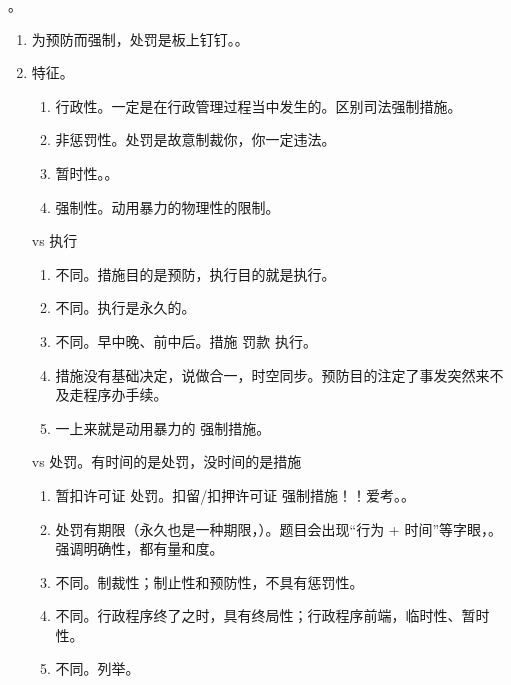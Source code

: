 \begin{enumerate}
        。
        \begin{enumerate}
          \item 为预防而强制，处罚是板上钉钉。。
          \item 特征。
                \begin{enumerate}
                  \item 行政性。一定是在行政管理过程当中发生的。区别司法强制措施。
                  \item 非惩罚性。处罚是故意制裁你，你一定违法。
                  \item 暂时性。。
                  \item 强制性。动用暴力的物理性的限制。
                \end{enumerate}

                \begin{kk}{vs 执行}
                  \begin{enumerate}
                    \item {}不同。措施目的是预防，执行目的就是执行。
                    \item {}不同。执行是永久的。
                    \item {}不同。早中晚、前中后。措施 \yjt 罚款 \yjt 执行。
                    \item 措施没有基础决定，说做合一，时空同步。预防目的注定了事发突然来不及走程序办手续。
                    \item 一上来就是动用暴力的 \yjt 强制措施。
                  \end{enumerate}
                \end{kk}

                \begin{kk}{vs 处罚。有时间的是处罚，没时间的是措施}
                  \begin{enumerate}
                    \item 暂扣许可证 \yjt 处罚。扣留/扣押许可证 \yjt 强制措施！！爱考。。
                    \item 处罚有期限（永久也是一种期限，）。题目会出现“行为 + 时间”等字眼，。
                          强调明确性，都有量和度。
                    \item {}不同。制裁性；制止性和预防性，不具有惩罚性。
                    \item {}不同。行政程序终了之时，具有终局性；行政程序前端，临时性、暂时性。
                    \item {}不同。列举。
                  \end{enumerate}
                \end{kk}


\end{enumerate}
\end{enumerate}
